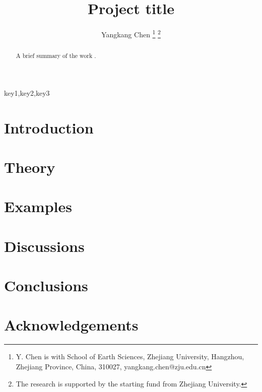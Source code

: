 \title{Project title}
\renewcommand{\thefootnote}{\fnsymbol{footnote}}
\author{Yangkang Chen
\thanks{Y. Chen is with School of Earth Sciences, Zhejiang University, Hangzhou, Zhejiang Province, China, 310027, yangkang.chen@zju.edu.cn}
\thanks{The research is supported by the starting fund from Zhejiang University.}}
\maketitle

\begin{abstract}
A brief summary of the work \cite{yangkang20142}.
\end{abstract}

\begin{keywords}
key1,key2,key3
\end{keywords}

\section{Introduction}
\section{Theory}
\section{Examples}
\section{Discussions}
\section{Conclusions}
\section{Acknowledgements}
















